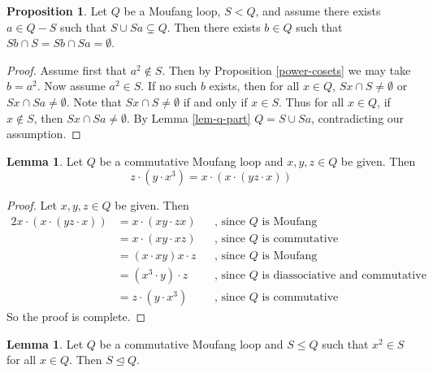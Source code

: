 \documentclass[12pt]{report}
\theoremstyle{definition}
\newtheorem{lem}[thm]{Lemma}
\newtheorem{prp}[thm]{Proposition}
\begin{document}
\begin{prp}
  Let $Q$ be a Moufang loop, $S < Q$, and assume there exists $a\in Q- S$ such that
    $S\cup Sa \subsetneq Q$. Then there exists $b\in Q$ such that $Sb\cap S = Sb\cap Sa = \emptyset$.
\end{prp}

\begin{proof}
  Assume first that $a^2\not\in S$. Then by Proposition \ref{power-cosets} we may take $b=a^2$.
    Now assume $a^2\in S$. If no such $b$ exists, then for all $x\in Q$, $Sx\cap S \neq \emptyset$
    or $Sx\cap Sa \neq \emptyset$. Note that $Sx\cap S\neq\emptyset$ if and only if $x\in S$. Thus
    for all $x\in Q$, if $x\not\in S$, then $Sx\cap Sa\neq\emptyset$. By Lemma
    \ref{lem-q-part} $Q = S\cup Sa$, contradicting our assumption.
\end{proof}

\begin{lem}\label{lem-technical-1}
  Let $Q$ be a commutative Moufang loop and $x, y, z\in Q$ be given. Then 
  \[z\cdot(y\cdot x^3) = x\cdot(x\cdot(yz\cdot x))\]
\end{lem}

\begin{proof}
  Let $x, y, z\in Q$ be given. Then
  \begin{alignat*}{2}
    x\cdot (x\cdot (yz\cdot x)) &= x\cdot (xy\cdot zx) &&\text{, since $Q$ is Moufang}\\
    &= x\cdot(xy\cdot xz)   &&\text{, since $Q$ is commutative}\\
    &= (x\cdot xy)x\cdot z  &&\text{, since $Q$ is Moufang}\\
    &= (x^3\cdot y)\cdot z  &&\text{, since $Q$ is diassociative and commutative}\\
    &= z\cdot (y\cdot x^3)  &&\text{, since $Q$ is commutative}
  \end{alignat*}
  So the proof is complete.
\end{proof}

\begin{lem}\label{lem-squaresNormal}
  Let $Q$ be a commutative Moufang loop and $S\leq Q$ such that $x^2\in S$ for all $x\in Q$. Then $S\unlhd Q$.
\end{lem}
\end{document}
